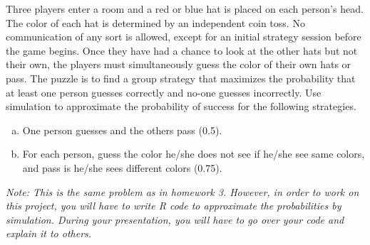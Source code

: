 \documentclass[12pt]{article}
\begin{document}
Three players enter a room and a red or blue hat is placed on each
person's head.  The color of each hat is determined by an independent coin
toss. No communication of any sort is allowed, except for an initial strategy
session before the game begins.  Once they have had a chance to look at the
other hats but not their own, the players must simultaneously guess the
color of their own hats or pass. The puzzle is to find a group strategy that
maximizes the probability that at least one person guesses correctly and
no-one guesses incorrectly. Use simulation to approximate the probability of success for the following strategies.
\begin{enumerate}[a.]
\item One person guesses and the others pass (0.5). 
\item For each person, guess the color he/she does
  not see if he/she see same colors, and pass is he/she sees different
  colors (0.75).
\end{enumerate}

{\it Note: This is the same problem as in homework 3. However, in order to work on this project, you will have to write R code to approximate the probabilities by simulation. During your presentation, you will have to go over your code and explain it to others.}
\end{document}
